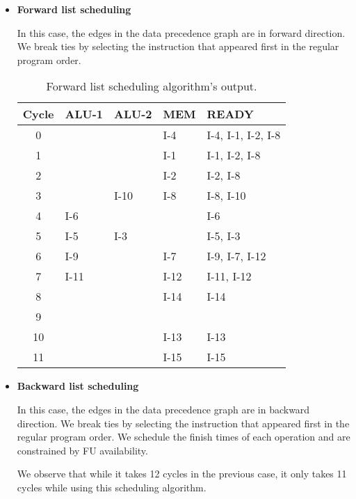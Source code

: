 \begin{itemize}
\item \textbf{Forward list scheduling}

  In this case, the edges in the data precedence graph are in forward direction.
  We break ties by selecting the instruction that appeared first in the regular
  program order.
  
\begin{table}
\centering
\begin{tabular}{c|l|l|l|l}
  \toprule
  \toprule
  \textbf{Cycle} & \textbf{ALU-1} & \textbf{ALU-2} & \textbf{MEM} & \textbf{READY} \\
  \midrule
  0  &      &      &  I-4  & I-4, I-1, I-2, I-8 \\ \hline
  1  &      &      &  I-1  & I-1, I-2, I-8      \\ \hline
  2  &      &      &  I-2  & I-2, I-8           \\ \hline
  3  &      & I-10 &  I-8  & I-8, I-10          \\ \hline
  4  & I-6  &      &       & I-6                \\ \hline
  5  & I-5  & I-3  &       & I-5, I-3           \\ \hline
  6  & I-9  &      &  I-7  & I-9, I-7, I-12     \\ \hline
  7  & I-11 &      &  I-12 & I-11, I-12         \\ \hline
  8  &      &      &  I-14 & I-14               \\ \hline
  9  &      &      &       &                    \\ \hline
  10 &      &      &  I-13 & I-13               \\ \hline
  11 &      &      &  I-15 & I-15               \\ \hline
  \bottomrule
\end{tabular}
\caption{Forward list scheduling algorithm's output.}
\end{table}

\item \textbf{Backward list scheduling}

  In this case, the edges in the data precedence graph are in backward direction.
  We break ties by selecting the instruction that appeared first in the regular
  program order. We schedule the finish times of each operation and are constrained
  by FU availability.

  We observe that while it takes 12 cycles in the previous case, it only takes 11
  cycles while using this scheduling algorithm.
  

\end{itemize}
